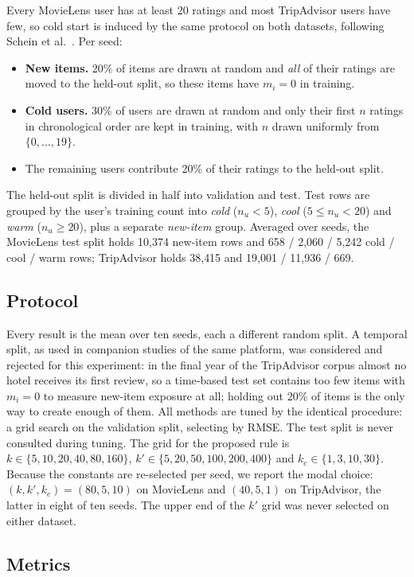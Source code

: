 \documentclass[runningheads]{llncs}
\begin{document}
Every MovieLens user has at least 20 ratings and most TripAdvisor users have few, so cold start is induced by the same protocol on both datasets, following Schein et al.~\cite{schein2002}. Per seed:
\begin{itemize}
  \item \textbf{New items.} 20\% of items are drawn at random and \emph{all} of their ratings are moved to the held-out split, so these items have $m_i = 0$ in training.
  \item \textbf{Cold users.} 30\% of users are drawn at random and only their first $n$ ratings in chronological order are kept in training, with $n$ drawn uniformly from $\{0,\dots,19\}$.
  \item The remaining users contribute 20\% of their ratings to the held-out split.
\end{itemize}
The held-out split is divided in half into validation and test. Test rows are grouped by the user's training count into \emph{cold} ($n_u < 5$), \emph{cool} ($5 \le n_u < 20$) and \emph{warm} ($n_u \ge 20$), plus a separate \emph{new-item} group. Averaged over seeds, the MovieLens test split holds 10{,}374 new-item rows and 658 / 2{,}060 / 5{,}242 cold / cool / warm rows; TripAdvisor holds 38{,}415 and 19{,}001 / 11{,}936 / 669.

\subsection{Protocol}

Every result is the mean over ten seeds, each a different random split. A temporal split, as used in companion studies of the same platform, was considered and rejected for this experiment: in the final year of the TripAdvisor corpus almost no hotel receives its first review, so a time-based test set contains too few items with $m_i = 0$ to measure new-item exposure at all; holding out 20\% of items is the only way to create enough of them. All methods are tuned by the identical procedure: a grid search on the validation split, selecting by RMSE. The test split is never consulted during tuning. The grid for the proposed rule is $k \in \{5,10,20,40,80,160\}$, $k' \in \{5,20,50,100,200,400\}$ and $k_c \in \{1,3,10,30\}$. Because the constants are re-selected per seed, we report the modal choice: $(k,k',k_c) = (80,5,10)$ on MovieLens and $(40,5,1)$ on TripAdvisor, the latter in eight of ten seeds. The upper end of the $k'$ grid was never selected on either dataset.

\subsection{Metrics}
\end{document}
